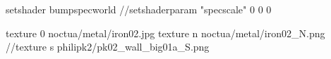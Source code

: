 setshader bumpspecworld
//setshaderparam "specscale" 0 0 0

texture 0 noctua/metal/iron02.jpg
texture n noctua/metal/iron02_N.png
//texture s philipk2/pk02_wall_big01a_S.png

